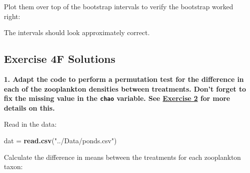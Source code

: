 \documentclass[]{book}
\newenvironment{Shaded}{\begin{snugshade}}{\end{snugshade}}
\newcommand{\KeywordTok}[1]{\textcolor[rgb]{0.13,0.29,0.53}{\textbf{#1}}}
\newcommand{\DataTypeTok}[1]{\textcolor[rgb]{0.13,0.29,0.53}{#1}}
\newcommand{\StringTok}[1]{\textcolor[rgb]{0.31,0.60,0.02}{#1}}
\newcommand{\OperatorTok}[1]{\textcolor[rgb]{0.81,0.36,0.00}{\textbf{#1}}}
\newcommand{\NormalTok}[1]{#1}
\theoremstyle{definition}
\theoremstyle{definition}
\theoremstyle{definition}
\theoremstyle{remark}
\begin{document}
Plot them over top of the bootstrap intervals to verify the bootstrap
worked right:

The intervals should look approximately correct.

\hypertarget{ex4f-answers}{\subsection*{Exercise 4F
Solutions}\label{ex4f-answers}}

\textbf{1. Adapt the code to perform a permutation test for the
difference in each of the zooplankton densities between treatments.
Don't forget to fix the missing value in the \texttt{chao} variable. See
\protect\hyperlink{ex1b}{Exercise 2} for more details on this.}

Read in the data:

\begin{Shaded}
\begin{Highlighting}[]
\NormalTok{dat =}\StringTok{ }\KeywordTok{read.csv}\NormalTok{(}\StringTok{"../Data/ponds.csv"}\NormalTok{)}
\end{Highlighting}
\end{Shaded}

Calculate the difference in means between the treatments for each
zooplankton taxon:

\begin{Shaded}
\end{Shaded}
\end{document}
